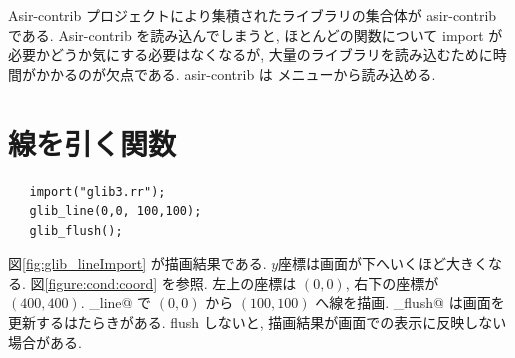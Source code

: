 \documentclass{jbook}
\begin{document}
Asir-contrib プロジェクトにより集積されたライブラリの集合体が
asir-contrib である.  
Asir-contrib を読み込んでしまうと,
ほとんどの関数について import が必要かどうか気にする必要はなくなるが,
大量のライブラリを読み込むために時間がかかるのが欠点である.
asir-contrib は  メニューから読み込める.
\begin{center}
\end{center}

\section{線を引く関数}

\begin{example} \rm
\begin{screen}
\begin{verbatim}
   import("glib3.rr");
   glib_line(0,0, 100,100);
   glib_flush();
\end{verbatim}
\end{screen}
図\ref{fig:glib_lineImport} が描画結果である.
$y$座標は画面が下へいくほど大きくなる.
図\ref{figure:cond:coord} を参照.
左上の座標は $(0,0)$, 右下の座標が $(400,400)$.
\verb@glib_line@ で $(0,0)$ から $(100,100)$ へ線を描画.
\verb@glib_flush@ は画面を更新するはたらきがある. flush しないと,
描画結果が画面での表示に反映しない場合がある.
\end{example}
\end{document}
